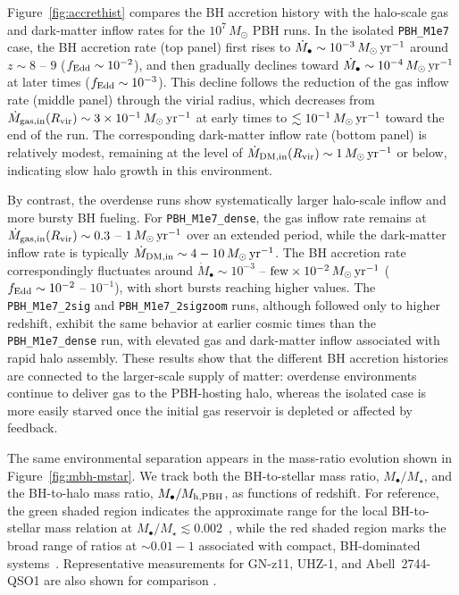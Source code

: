 \documentclass[twocolumn,trackchanges]{aastex701}
\begin{document}
Figure~\ref{fig:accrethist} compares the BH accretion history with the halo-scale gas and dark-matter inflow rates for the $10^7\,M_\odot$ PBH runs. In the isolated \texttt{PBH\_M1e7} case, the BH accretion rate (top panel) first rises to $\dot{M}_\bullet\sim  10^{-3}\,M_\odot\,{\rm yr}^{-1}$ around $z\sim8$ -- $9$ ($f_{\rm Edd}\sim10^{-2}$), and then gradually declines toward $\dot{M}_\bullet\sim10^{-4}\,M_\odot\,{\rm yr}^{-1}$ at later times ($f_{\rm Edd}\sim10^{-3}$). This decline follows the reduction of the gas inflow rate (middle panel) through the virial radius, which decreases from $\dot{M}_{\rm gas,in}(R_{\rm vir})\sim 3\times10^{-1}\,M_\odot\,{\rm yr}^{-1}$ at early times to $\lesssim10^{-1}\,M_\odot\,{\rm yr}^{-1}$ toward the end of the run. The corresponding dark-matter inflow rate (bottom panel) is relatively modest, remaining at the level of $\dot{M}_{\rm DM,in}(R_{\rm vir})\sim1\,M_\odot\,{\rm yr}^{-1}$ or below, indicating slow halo growth in this environment.

By contrast, the overdense runs show systematically larger halo-scale inflow and more bursty BH fueling. For \texttt{PBH\_M1e7\_dense}, the gas inflow rate remains at $\dot{M}_{\rm gas,in}(R_{\rm vir})\sim0.3$ -- $1\,M_\odot\,{\rm yr}^{-1}$ over an extended period, while the dark-matter inflow rate is typically $\dot{M}_{\rm DM,in}\sim4-10\,M_\odot\,{\rm yr}^{-1}$. The BH accretion rate correspondingly fluctuates around $\dot{M}_\bullet\sim10^{-3}$ -- ${\rm few}\times10^{-2}\,M_\odot\,{\rm yr}^{-1}$ ($f_{\rm Edd}\sim10^{-2}$ -- $10^{-1}$), with short bursts reaching higher values. The \texttt{PBH\_M1e7\_2sig} and \texttt{PBH\_M1e7\_2sigzoom} runs, although followed only to higher redshift, exhibit the same behavior at earlier cosmic times than the \texttt{PBH\_M1e7\_dense} run, with elevated gas and dark-matter inflow associated with rapid halo assembly. These results show that the different BH accretion histories are connected to the larger-scale supply of matter: overdense environments continue to deliver gas to the PBH-hosting halo, whereas the isolated case is more easily starved once the initial gas reservoir is depleted or affected by feedback.


The same environmental separation appears in the mass-ratio evolution shown in Figure~\ref{fig:mbh-mstar}. We track both the BH-to-stellar mass ratio, $M_\bullet/M_\star$, and the BH-to-halo mass ratio, $M_\bullet/M_{\rm h,PBH}$, as functions of redshift. For reference, the green shaded region indicates the approximate range for the local BH-to-stellar mass relation at $M_\bullet/M_\star\lesssim 0.002$~\citep{Kormendy2013GalaxySMBH}, while the red shaded region marks the broad range of ratios at $\sim 0.01 -1$ associated with compact, BH-dominated systems~\citep[e.g.,][]{MaiolinoBH2024A&A,KocevskiLRD2025ApJ...986..126K}. Representative measurements for GN-z11, UHZ-1, and Abell~2744-QSO1 are also shown for comparison \citep[values adopted from][]{Natarajan:2023UHZ1,Scholtz2024A&A, Maiolino2024NaturBH,QSO1Direct2026Natur,KashlinskyPBH2026MNRAS}.
\end{document}
